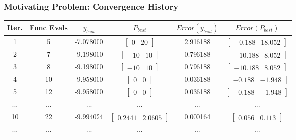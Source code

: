 \documentclass[aspectratio=169]{beamer}
\begin{document}
	\begin{frame}
		\frametitle{Motivating Problem: Convergence History}
		\begin{center}
		\begin{tabular}{||c c c c||c c||} 
			\hline
			Iter. & Func Evals & $y_{best}$ & $P_{best}$ & $Error(y_{best})$ & $Error(P_{best})$ \\ [0.5ex] 
			\hline\hline
			1 & 5 & -7.078000 & $\begin{bmatrix} 0 & 20 \end{bmatrix}$ & 2.916188 & $\begin{bmatrix} -0.188 & 18.052 \end{bmatrix}$ \\ 
			\hline
			2 & 7 & -9.198000 & $\begin{bmatrix} -10 & 10 \end{bmatrix}$ & 0.796188 & $\begin{bmatrix} -10.188 & 8.052 \end{bmatrix}$  \\
			\hline
			3 & 8 & -9.198000 & $\begin{bmatrix} -10 & 10 \end{bmatrix}$ & 0.796188 & $\begin{bmatrix} -10.188 & 8.052 \end{bmatrix}$\\
			\hline
			4 & 10 & -9.958000 & $\begin{bmatrix} 0 & 0 \end{bmatrix}$ & 0.036188 & $\begin{bmatrix} -0.188 & -1.948 \end{bmatrix}$\\
			\hline
			5 & 12 & -9.958000 & $\begin{bmatrix} 0 & 0 \end{bmatrix}$ & 0.036188 & $\begin{bmatrix} -0.188 & -1.948 \end{bmatrix}$\\ 
			\hline
			... & ... & ... & ... & ... & ... \\ 
			\hline
			10 & 22 & -9.994024 & $\begin{bmatrix} 0.2441 & 2.0605 \end{bmatrix}$ & 0.000164 & $\begin{bmatrix} 0.056 & 0.113 \end{bmatrix}$ \\ 			
			\hline
			... & ... & ... & ... & ... & ... \\ 

\end{tabular}
\end{center}
\end{frame}
\end{document}
